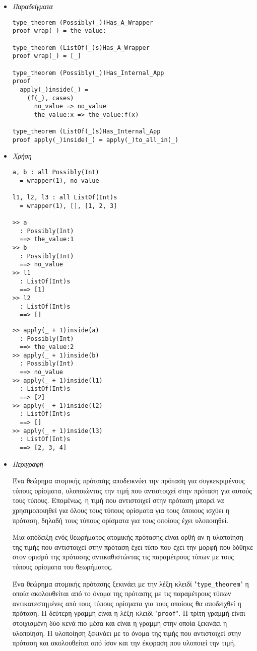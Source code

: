 \documentclass[diploma]{softlab-thesis}
\begin{document}
\begin{itemize}
\item \textit{Παραδείγματα}

\begin{verbatim}
type_theorem (Possibly(_))Has_A_Wrapper
proof wrap(_) = the_value:_

type_theorem (ListOf(_)s)Has_A_Wrapper
proof wrap(_) = [_]

type_theorem (Possibly(_))Has_Internal_App
proof
  apply(_)inside(_) =
    (f(_), cases)
      no_value => no_value
      the_value:x => the_value:f(x)

type_theorem (ListOf(_)s)Has_Internal_App
proof apply(_)inside(_) = apply(_)to_all_in(_)
\end{verbatim}

\item \textit{Χρήση}

\begin{verbatim}
a, b : all Possibly(Int)
  = wrapper(1), no_value

l1, l2, l3 : all ListOf(Int)s
  = wrapper(1), [], [1, 2, 3]

>> a
  : Possibly(Int)
  ==> the_value:1
>> b
  : Possibly(Int)
  ==> no_value
>> l1
  : ListOf(Int)s
  ==> [1]
>> l2
  : ListOf(Int)s
  ==> []
\end{verbatim}
\newpage
\begin{verbatim}
>> apply(_ + 1)inside(a)
  : Possibly(Int)
  ==> the_value:2
>> apply(_ + 1)inside(b)
  : Possibly(Int)
  ==> no_value
>> apply(_ + 1)inside(l1)
  : ListOf(Int)s
  ==> [2]
>> apply(_ + 1)inside(l2)
  : ListOf(Int)s
  ==> []
>> apply(_ + 1)inside(l3)
  : ListOf(Int)s
  ==> [2, 3, 4]
\end{verbatim}

\item \textit{Περιγραφή}

Ένα θεώρημα ατομικής πρότασης αποδεικνύει την πρόταση για συγκεκριμένους
τύπους ορίσματα, υλοποιώντας την τιμή που αντιστοιχεί στην πρόταση για αυτούς
τους τύπους. Επομένως, η τιμή που αντιστοιχεί στην πρόταση μπορεί να
χρησιμοποιηθεί για όλους τους τύπους ορίσματα για τους όποιους ισχύει η
πρόταση, δηλαδή τους τύπους ορίσματα για τους οποίους έχει υλοποιηθεί.

Μια απόδειξη ενός θεωρήματος ατομικής πρότασης είναι ορθή αν η υλοποίηση
της τιμής που αντιστοιχεί στην πρόταση έχει τύπο που έχει την μορφή
που δόθηκε στον ορισμό της πρότασης αντικαθιστώντας τις παραμέτρους τύπων
με τους τύπους ορίσματα του θεωρήματος.

Ένα θεώρημα ατομικής πρότασης ξεκινάει με την λέξη κλειδί "\verb|type_theorem|"
η οποία ακολουθείται από το όνομα της πρότασης με τις παραμέτρους τύπων
αντικατεστημένες από τους τύπους ορίσματα για τους οποίους θα αποδειχθεί η
πρόταση. Η δεύτερη γραμμή είναι η λέξη κλειδί "\verb|proof|".  Η τρίτη γραμμή
είναι στοιχισμένη δύο κενά πιο μέσα και είναι η γραμμή στην οποία ξεκινάει η
υλοποίηση. Η υλοποίηση ξεκινάει με το όνομα της τιμής που αντιστοιχεί στην
πρόταση και ακολουθείται από ίσον και την έκφραση που υλοποιεί την τιμή.

\end{itemize}
\end{document}
